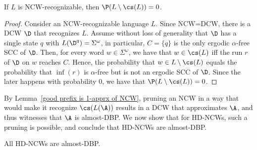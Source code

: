 \documentclass{lmcs}
\begin{document}
\begin{lem}\label{good prefix is 1-apprx of NCW}	If $L$ is NCW-recognizable, then $\P(L\setminus \cs(L))=0$.
\end{lem}

\begin{proof}
Consider an NCW-recognizable language $L$. Since NCW=DCW, there is a DCW $\D$ that recognizes $L$. Assume without loss of generality that $\D$ has a single state $q$ with $L(\D^q) = \Sigma^\omega$, in particular, $C = \{q\}$ is the only ergodic $\alpha$-free SCC of $\D$. Then, for every word $w \in \Sigma^\omega$, we have that $w \in \cs(L)$ iff the run $r$ of $\D$ on $w$ reaches $C$. Hence, the probability that $w \in L\setminus \cs(L)$ equals the probability that $\inf(r)$ is $\alpha$-free but is not an ergodic SCC of $\D$. Since the later happens with probability 0, we have that  $\P(L\setminus \cs(L))=0$.
\end{proof}

By Lemma~\ref{good prefix is 1-apprx of NCW}, pruning an NCW in a way that would make it recognize $\cs(L(\A))$ results in a DCW that approximates $\A$, and thus witnesses that $\A$ is almost-DBP. We now show that for HD-NCWs, such a pruning is possible, and conclude that HD-NCWs are almost-DBP. 

\begin{thm}\label{HD-ncw almost}All HD-NCWs are almost-DBP.\end{thm}
\end{document}
